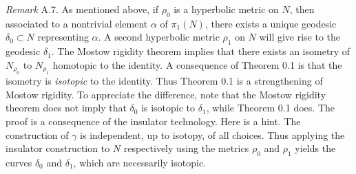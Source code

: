 {\it Remark} A.7.  As mentioned above, if $\rho_0$ is a hyperbolic
metric on $N$, then   associated to a  nontrivial element $\alpha$ of
$\pi_1(N) $,
there exists a unique  geodesic $\delta_0 \subset N$ representing
$\alpha$.  A second hyperbolic metric $\rho_1$ on $N$ will give rise to the
geodesic $\delta_1$.  The Mostow rigidity theorem implies that there exists an
isometry of $N_{\rho_0}$ to $N_{\rho_1}$ homotopic to the identity.  A consequence of
Theorem 0.1 is that  the isometry is {\it isotopic} to the identity.
Thus Theorem
0.1 is a strengthening of Mostow rigidity.  To appreciate the difference,
note that the
Mostow rigidity theorem does not imply that $\delta_0$ is isotopic to
$\delta_1$,
while Theorem 0.1 does.    The proof is a
consequence of the insulator technology.   Here is a hint.  The
construction of
$\gamma$ is independent, up to isotopy, of all choices.  Thus applying the
insulator
construction to $N$ respectively using the metrics $\rho_0$ and $\rho_1$
yields the
curves
$\delta_0$ and
$\delta_1$, which are necessarily isotopic. 


 




